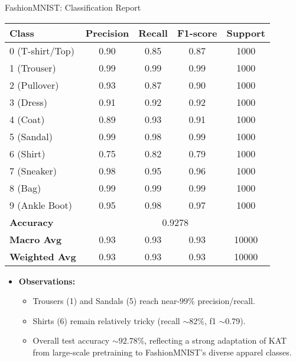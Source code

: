 \documentclass{beamer}
\begin{document}
\begin{frame}{FashionMNIST: Classification Report}
  \small
  \begin{table}[ht]
    \centering
    \begin{tabular}{lcccc}
      \toprule
      \textbf{Class} & \textbf{Precision} & \textbf{Recall} & \textbf{F1-score} & \textbf{Support}\\
      \midrule
      0 (T-shirt/Top) & 0.90 & 0.85 & 0.87 & 1000 \\
      1 (Trouser)     & 0.99 & 0.99 & 0.99 & 1000 \\
      2 (Pullover)    & 0.93 & 0.87 & 0.90 & 1000 \\
      3 (Dress)       & 0.91 & 0.92 & 0.92 & 1000 \\
      4 (Coat)        & 0.89 & 0.93 & 0.91 & 1000 \\
      5 (Sandal)      & 0.99 & 0.98 & 0.99 & 1000 \\
      6 (Shirt)       & 0.75 & 0.82 & 0.79 & 1000 \\
      7 (Sneaker)     & 0.98 & 0.95 & 0.96 & 1000 \\
      8 (Bag)         & 0.99 & 0.99 & 0.99 & 1000 \\
      9 (Ankle Boot)  & 0.95 & 0.98 & 0.97 & 1000 \\
      \midrule
      \textbf{Accuracy}    & \multicolumn{4}{c}{0.9278} \\
      \textbf{Macro Avg}   & 0.93 & 0.93 & 0.93 & 10000 \\
      \textbf{Weighted Avg}& 0.93 & 0.93 & 0.93 & 10000 \\
      \bottomrule
    \end{tabular}
  \end{table}
  
  \begin{itemize}
    \item \textbf{Observations:}
      \begin{itemize}
        \item Trousers (1) and Sandals (5) reach near-$99\%$ precision/recall.
        \item Shirts (6) remain relatively tricky (recall $\sim$82\%, f1 $\sim$0.79).
        \item Overall test accuracy $\sim 92.78\%$, reflecting a strong adaptation of KAT from large-scale pretraining to FashionMNIST’s diverse apparel classes.
      \end{itemize}
  \end{itemize}
  \end{frame}
\end{document}

